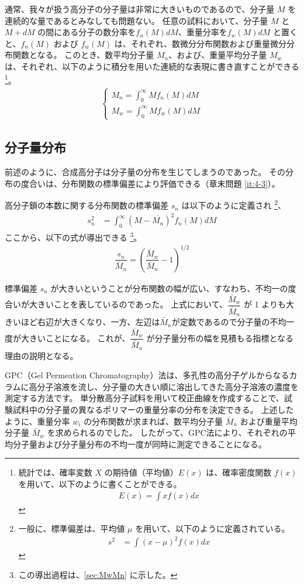 \documentclass[a4paper,11pt]{ltjsarticle}
\begin{document}
通常、我々が扱う高分子の分子量は非常に大きいものであるので、分子量 $M$ を連続的な量であるとみなしても問題ない。
任意の試料において、分子量 $M$ と $M+dM$ の間にある分子の数分率を$f_n(M)dM$、重量分率を$f_w(M)dM$ と置くと、$f_n(M)$ および $f_w(M)$ は、それぞれ、数微分分布関数および重量微分分布関数となる。
このとき、数平均分子量 $M_n$、および、重量平均分子量 $M_w$ は、それぞれ、以下のように積分を用いた連続的な表現に書き直すことができる
\footnote
{
統計では、確率変数 $X$ の期待値（平均値）$E(x)$ は、確率密度関数 $f(x)$ を用いて、以下のように書くことができる。
\begin{align*}
E(x) = \displaystyle \int x f(x) dx
\end{align*}
}。
\begin{align}
\begin{cases}
M_n = \displaystyle\int_0^{\infty} M f_n (M)dM \\[10pt]
M_w = \displaystyle\int_0^{\infty} M f_w (M)dM
\end{cases}
\end{align}

\subsection{分子量分布}

前述のように、合成高分子は分子量の分布を生じてしまうのであった。
その分布の度合いは、分布関数の標準偏差により評価できる（章末問題 \ref{it:4-3}）。

高分子鎖の本数に関する分布関数の標準偏差 $s_n$ は以下のように定義され
\footnote
{
一般に、標準偏差は、平均値 $\mu$ を用いて、以下のように定義されている。
\begin{align*}
s^2
	&= \displaystyle \int(x - \mu)^2 f(x) dx
\end{align*}
}、
\begin{align}
s_n^2
	&= \displaystyle \int_0^{\infty}(M - \bar{M_n})^2 f_n(M) dM
\end{align}
ここから、以下の式が導出できる
\footnote
{
この導出過程は、\ref{sec:MwMn} に示した。
}。
\begin{align}
\dfrac{s_n}{\bar{M}_n} = \left(\dfrac{\bar{M}_w}{\bar{M}_n}-1\right)^{1/2}
\end{align}

標準偏差 $s_n$ が大きいということが分布関数の幅が広い、すなわち、不均一の度合いが大きいことを表しているのであった。
上式において、$\dfrac{\bar{M}_w}{\bar{M}_n}$ が 1 よりも大きいほど右辺が大きくなり、一方、左辺は$\bar{M}_n$が定数であるので分子量の不均一度が大きいことになる。
これが、$\dfrac{\bar{M}_w}{\bar{M}_n}$ が分子量分布の幅を見積もる指標となる理由の説明となる。
 
GPC（Gel Permeation Chromatography）法は、多孔性の高分子ゲルからなるカラムに高分子溶液を流し、分子量の大きい順に溶出してきた高分子溶液の濃度を測定する方法です。
単分散高分子試料を用いて校正曲線を作成することで、試験試料中の分子量の異なるポリマーの重量分率の分布を決定できる。
上述したように、重量分率 $w_i$ の分布関数が求まれば、数平均分子量 $\bar{M}_n$ および重量平均分子量 $\bar{M}_w$ を求められるのでした。
したがって、GPC法により、それぞれの平均分子量および分子量分布の不均一度が同時に測定できることになる。
\end{document}

